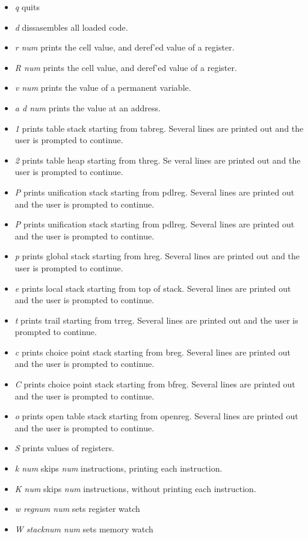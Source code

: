 \documentclass[11pt]{article}
\begin{document}
\begin{itemize}
	\item {\em q} quits 	
\item {\em d} dissasembles all loaded
code.  	
\item {\em r num} prints the cell value, and deref'ed value of
a register.  	
\item {\em R num} prints the cell value, and deref'ed
value of a register.  	
\item {\em v num} prints the value of a
permanent variable.  	
\item {\em a d num} prints the value at an
address.  	
\item {\em 1} prints table stack starting from tabreg.
Several lines are printed out and the user is prompted to continue.
\item {\em 2} prints table heap starting from threg.  Se
veral lines
are printed out and the user is prompted to continue.  
\item {\em P}
prints unification stack starting from pdlreg.  Several lines are
printed out and the user is prompted to continue.  	
\item {\em P}
prints unification stack starting from pdlreg.  Several lines are
printed out and the user is prompted to continue.  	
\item {\em p}
prints global stack starting from hreg.  Several lines are printed out
and the user is prompted to continue.  	
\item {\em e} prints local
stack starting from top of stack.  Several lines are printed out and
the user is prompted to continue.  	
\item {\em t} prints trail
starting from trreg.  Several lines are printed out and the user is
prompted to continue.  	
\item {\em c} prints choice point stack
starting from breg.  Several lines are printed out and the user is
prompted to continue.  
\item {\em C} prints choice point stack
starting from bfreg.  Several lines are printed out and the user is
prompted to continue.  	
\item {\em o} prints open table stack starting
from openreg.  Several lines are printed out and the user is prompted
to continue.  	
\item {\em S} prints values of registers.  	
\item {\em k num} skips {\em num} instructions, printing each instruction.
\item {\em K num} skips {\em num} instructions, without printing each
instruction. 
\item {\em w regnum num} sets register watch
\item {\em W stacknum num} sets memory watch
\end{itemize}
\end{document}
